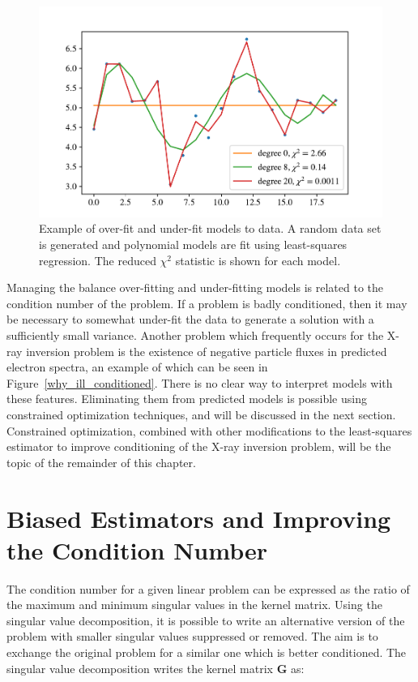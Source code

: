 \begin{figure}[p]
    \centering
    \includegraphics[width=1.0\textwidth]{figures/chapter_4/overunderfit_example/overfit_underfit.pdf}
    \caption{Example of over-fit and under-fit models to data. A random data set is generated and polynomial models are fit using least-squares regression. The reduced $\chi^2$ statistic is shown for each model.}
    \label{overunderfit_example}
\end{figure}

Managing the balance over-fitting and under-fitting models is related to the condition number of the problem. If a problem is badly conditioned, then it may be necessary to somewhat under-fit the data to generate a solution with a sufficiently small variance. Another problem which frequently occurs for the X-ray inversion problem is the existence of negative particle fluxes in predicted electron spectra, an example of which can be seen in Figure~\ref{why_ill_conditioned}. There is no clear way to interpret models with these features. Eliminating them from predicted models is possible using constrained optimization techniques, and will be discussed in the next section. Constrained optimization, combined with other modifications to the least-squares estimator to improve conditioning of the X-ray inversion problem, will be the topic of the remainder of this chapter. 

\section{Biased Estimators and Improving the Condition Number}

The condition number for a given linear problem can be expressed as the ratio of the maximum and minimum singular values in the kernel matrix. Using the singular value decomposition, it is possible to write an alternative version of the problem with smaller singular values suppressed or removed. The aim is to exchange the original problem for a similar one which is better conditioned. The singular value decomposition writes the kernel matrix $\mathbf{G}$ as:

